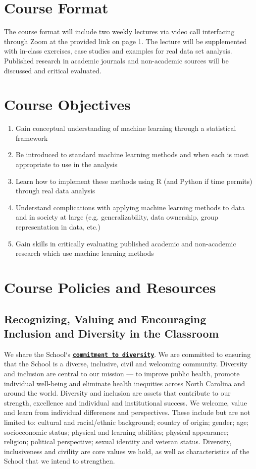 \documentclass[11pt]{article}
\begin{document}
\section*{Course Format}
The course format will include two weekly lectures via video call interfacing through Zoom at the provided link on page 1. The lecture will be supplemented with in-class exercises, case studies and examples for real data set analysis.  Published research in academic journals and non-academic sources will be discussed and critical evaluated.

\section*{Course Objectives}
\begin{enumerate}
\item Gain conceptual understanding of machine learning through a statistical framework
\item Be introduced to standard machine learning methods and when each is most appropriate to use in the analysis
\item Learn how to implement these methods using R (and Python if time permits) through real data analysis
\item Understand complications with applying machine learning methods to data and in society at large (e.g. generalizability, data ownership, group representation in data, etc.)
\item Gain skills in critically evaluating published academic and non-academic research which use machine learning methods
\end{enumerate}

\section*{Course Policies and Resources}
\subsection*{Recognizing, Valuing and Encouraging Inclusion and Diversity in the Classroom}
We share the School`s \href{https://sph.unc.edu/resource-pages/inclusive-excellence/diversity}{\tt\bf commitment to diversity}.  We are committed to ensuring that the School is a diverse, inclusive, civil and welcoming community. Diversity and inclusion are central to our mission — to improve public health, promote individual well-being and eliminate health inequities across North Carolina and around the world.  Diversity and inclusion are assets that contribute to our strength, excellence and individual and institutional success. We welcome, value 
and learn from individual differences and perspectives. These include but are not limited to: cultural and racial/ethnic background; country of origin; gender; age; socioeconomic status; physical and learning abilities; physical appearance; religion; political perspective; sexual identity and veteran status. Diversity, inclusiveness and civility are core values we hold, as well as characteristics of the 
School that we intend to strengthen. 
\end{document}
